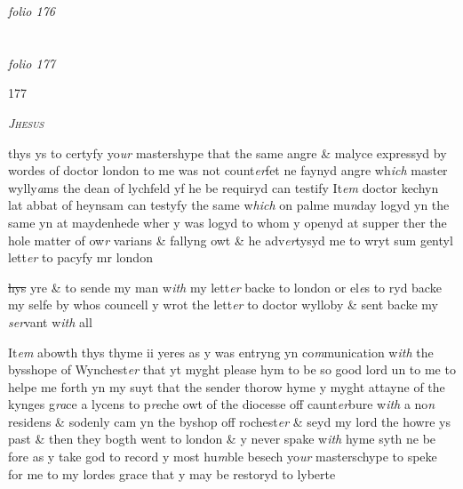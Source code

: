 \documentclass[12pt, a4paper]{book}
\begin{document}
\dotfill
					

\textit{folio 176}


         \vspace{4cm}
         
\dotfill
					  \section*{}

\textit{folio 177}



\begin{flushright}{\color{Mahogany}177}\end{flushright}
            		
				\begin{center} \begin{large} {\scshape \textit{Jhesus}} \end{large} \end{center}
			
            		
            			
		\ifthenelse{\isodd{\thepage}}
		{\reversemarginpar}
		{\normalmarginpar}
		thys ys to certyfy yo\textit{ur} mastershype that the same angre \& malyce expressyd by wordes of doctor london to me
			 was not count\textit{er}fet ne faynyd angre wh\textit{ich} master wylly\textit{a}ms the dean of lychfeld yf he be requiryd can testify It\textit{em} doctor kechyn lat abbat of heynsam can testyfy the same w\textit{hich} on palme mu\textit{n}day logyd yn the same yn 
			at maydenhede wher y was logyd to whom y openyd at supper ther the hole matter of ow\textit{r} varians \& fallyng owt \& he adv\textit{er}tysyd me to wryt sum gentyl lett\textit{er} to pacyfy mr london
			
            				\sout{hys }yre \& to sende my man w\textit{ith} my lett\textit{er} backe to london or el\textit{e}s to ryd backe my selfe by whos councell y wrot the lett\textit{er} to doctor wylloby \& sent backe my \textit{ser}vant w\textit{ith} all 
            			
		\ifthenelse{\isodd{\thepage}}
		{\reversemarginpar}
		{\normalmarginpar}
		It\textit{em} abowth thys thyme ii yeres as
			 y was entryng yn co\textit{m}munication w\textit{ith }the bysshope of Wynchest\textit{er} that yt myght please hym to be so good lord un to me to helpe me forth yn my suyt that  the sender thorow hyme y myght attayne of the kynges g\textit{ra}ce a lycens to p\textit{re}che owt of the diocesse off caunt\textit{er}bure w\textit{ith} a  no\textit{n} residens \& sodenly cam yn the byshop off rochest\textit{er} \& seyd  my lord the howre ys past \& then they bogth went to london \& y never spake w\textit{ith} hyme syth ne be fore as y take god to record y most hu\textit{m}ble besech yo\textit{ur} masterschype to speke for me to my lordes grace that y may be restoryd  to lyberte
            		
\end{document}
